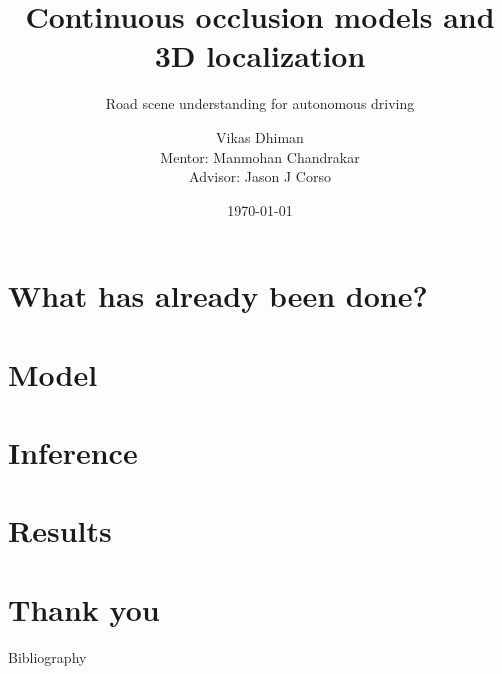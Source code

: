 
% 
%

%


\title{Continuous occlusion models and 3D localization}
\subtitle{Road scene understanding for autonomous driving}
\date{\today}
\author{Vikas Dhiman\\ Mentor: Manmohan Chandrakar\\ Advisor: Jason J Corso}

%



\maketitle

\section{What has already been done?}

% 
\section{Model}

% 
\section{Inference}

% 
\section{Results}

% 
\section{Thank you}
\begin{frame}{Bibliography}


\end{frame}


